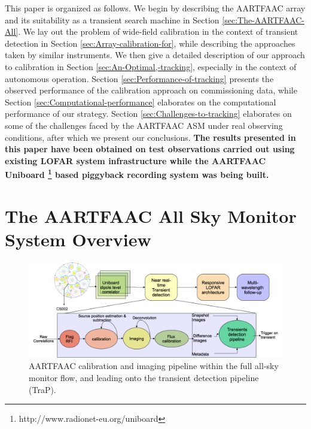 \documentclass{aa}
\begin{document}
This paper is  organized as follows.  We begin by  describing the AARTFAAC array
and   its    suitability   as   a   transient   search    machine   in   Section
\ref{sec:The-AARTFAAC-All}. We lay out  the problem of wide-field calibration in
the context  of transient detection  in Section \ref{sec:Array-calibration-for},
while describing  the approaches taken by  similar instruments.  We  then give a
detailed   description    of   our   approach   to    calibration   in   Section
\ref{sec:An-Optimal,-tracking},   especially  in   the  context   of  autonomous
operation.   Section  \ref{sec:Performance-of-tracking}  presents  the  observed
performance  of the calibration  approach on  commissioning data,  while Section
\ref{sec:Computational-performance} elaborates  on the computational performance
of our strategy.  Section \ref{sec:Challenges-to-tracking} elaborates on some of
the challenges faced by the  AARTFAAC ASM under real observing conditions, after
which we present  our conclusions. \textbf {The results  presented in this paper
  have  been obtained  on test  observations  carried out  using existing  LOFAR
  system infrastructure  while the  AARTFAAC Uniboard \footnote{http://www.radionet-eu.org/uniboard} based  piggyback recording
  system was being built.}


\section{\label{sec:The-AARTFAAC-All}The AARTFAAC All Sky Monitor System
Overview} 

\begin{figure}[htbp]
\centering
\includegraphics[width=1\textwidth]{Figs/AFAAC_blkdia_latest.png}
\caption{AARTFAAC  calibration  and imaging  pipeline  within  the full  all-sky
  monitor flow, and leading onto the transient detection pipeline (TraP).}
\label{fig:The-AARTFAAC-calibration}
\end{figure}
\end{document}

